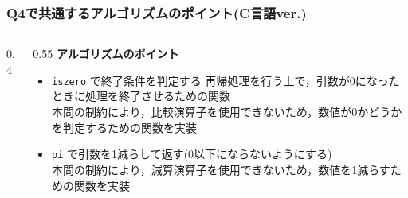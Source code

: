 \begin{frame}[fragile]
\frametitle{Q4で共通するアルゴリズムのポイント(C言語ver.)}
    \begin{columns}[c]
        
        \begin{column}{0.4\textwidth}
            
        \end{column}
        
        \begin{column}{0.55\textwidth}
            \small
            \textbf{アルゴリズムのポイント}
            \begin{itemize}
                \item \texttt{iszero} で終了条件を判定する
                再帰処理を行う上で，引数が0になったときに処理を終了させるための関数 \\
                本問の制約により，比較演算子を使用できないため，数値が0かどうかを判定するための関数を実装
                \item \texttt{pi} で引数を1減らして返す(0以下にならないようにする)\\
                本問の制約により，減算演算子を使用できないため，数値を1減らすための関数を実装
            \end{itemize}
        \end{column}
        
    \end{columns}
\end{frame}

